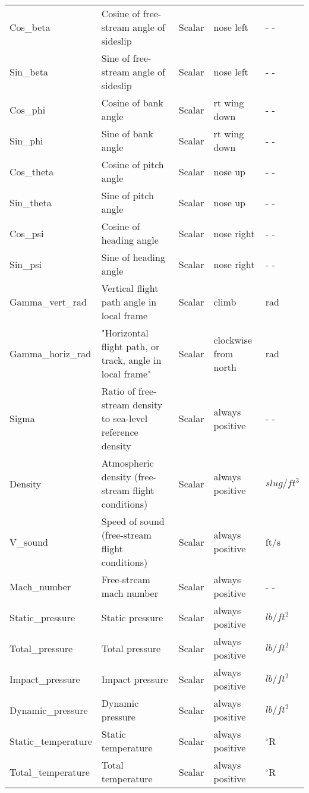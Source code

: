 \documentclass[10pt]{article}
\begin{document}
{\begin{tabular}{|l|p{2.0in}|p{1.0in}|p{1.0in}|l|}
Cos\_beta & Cosine of free-stream angle of sideslip & Scalar & nose left & - - \\ 
Sin\_beta & Sine of free-stream angle of sideslip & Scalar & nose left & - - \\ 
\hline
Cos\_phi & Cosine of bank angle & Scalar & rt wing down & - - \\ 
Sin\_phi & Sine of bank angle & Scalar & rt wing down & - - \\ 
Cos\_theta & Cosine of pitch angle & Scalar & nose up & - - \\ 
Sin\_theta & Sine of pitch angle & Scalar & nose up & - - \\ 
Cos\_psi & Cosine of heading angle & Scalar & nose right & - - \\ 
Sin\_psi & Sine of heading angle & Scalar & nose right & - - \\ 
\hline
Gamma\_vert\_rad & Vertical flight path angle in local frame & Scalar & climb & rad \\ 
Gamma\_horiz\_rad & "Horizontal flight path, or track, angle in local frame" & Scalar & clockwise from north & rad \\ 
\hline
Sigma & Ratio of free-stream density to sea-level reference density & Scalar & always positive & - - \\ 
Density & Atmospheric density (free-stream flight conditions) & Scalar & always positive & $slug/ft^3$ \\ 
V\_sound & Speed of sound (free-stream flight conditions) & Scalar & always positive & ft/s \\ 
Mach\_number & Free-stream mach number & Scalar & always positive & - - \\ 
\hline
Static\_pressure & Static pressure & Scalar & always positive & $lb/ft^2$ \\ 
Total\_pressure & Total pressure & Scalar & always positive & $lb/ft^2$ \\ 
Impact\_pressure & Impact pressure & Scalar & always positive & $lb/ft^2$ \\ 
Dynamic\_pressure & Dynamic pressure & Scalar & always positive & $lb/ft^2$ \\ 
\hline
Static\_temperature & Static temperature & Scalar & always positive &
$^{\circ}$R \\ 
Total\_temperature & Total temperature & Scalar & always positive &
$^{\circ}$R \\ 
\hline
\end{tabular}
}
\end{document}
